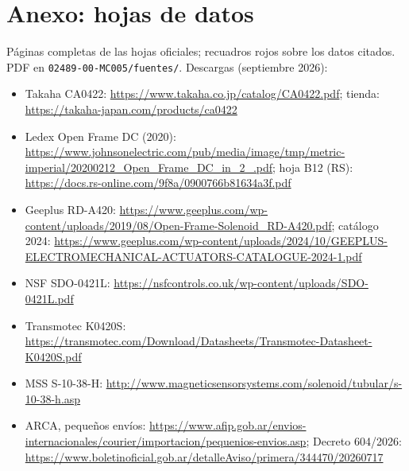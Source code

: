 \documentclass[11pt,a4paper]{article}
\begin{document}
\clearpage
\section{Anexo: hojas de datos}
\label{sec:anexo}
Páginas completas de las hojas oficiales; recuadros rojos sobre los datos citados. PDF en
\texttt{02489-00-MC005/fuentes/}. Descargas (septiembre 2026):

{\small
\begin{itemize}
  \item Takaha CA0422: \url{https://www.takaha.co.jp/catalog/CA0422.pdf}; tienda: \url{https://takaha-japan.com/products/ca0422}
  \item Ledex Open Frame DC (2020): \url{https://www.johnsonelectric.com/pub/media/image/tmp/metric-imperial/20200212_Open_Frame_DC_in_2_.pdf}; hoja B12 (RS): \url{https://docs.rs-online.com/9f8a/0900766b81634a3f.pdf}
  \item Geeplus RD-A420: \url{https://www.geeplus.com/wp-content/uploads/2019/08/Open-Frame-Solenoid_RD-A420.pdf}; catálogo 2024: \url{https://www.geeplus.com/wp-content/uploads/2024/10/GEEPLUS-ELECTROMECHANICAL-ACTUATORS-CATALOGUE-2024-1.pdf}
  \item NSF SDO-0421L: \url{https://nsfcontrols.co.uk/wp-content/uploads/SDO-0421L.pdf}
  \item Transmotec K0420S: \url{https://transmotec.com/Download/Datasheets/Transmotec-Datasheet-K0420S.pdf}
  \item MSS S-10-38-H: \url{http://www.magneticsensorsystems.com/solenoid/tubular/s-10-38-h.asp}
  \item ARCA, pequeños envíos: \url{https://www.afip.gob.ar/envios-internacionales/courier/importacion/pequenios-envios.asp}; Decreto 604/2026: \url{https://www.boletinoficial.gob.ar/detalleAviso/primera/344470/20260717}
\end{itemize}}
\end{document}
